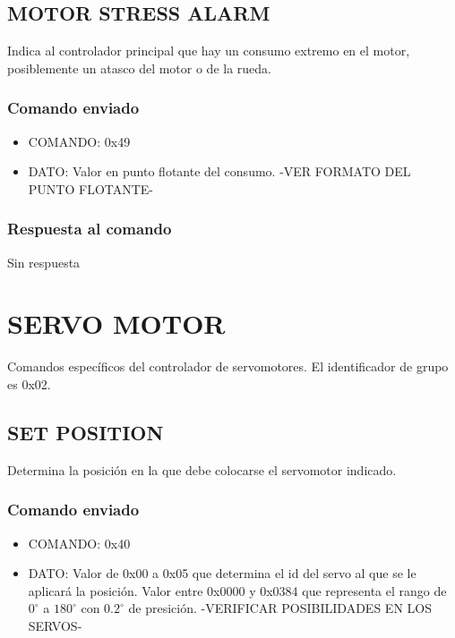 \documentclass[a4paper,10pt]{article}
\begin{document}
\subsection{MOTOR STRESS ALARM}
\label{motor_stress_alarm}

Indica al controlador principal que hay un consumo extremo en el motor, posiblemente un atasco del motor o de la rueda.

\subsubsection*{Comando enviado}

\begin{itemize}
	\item{COMANDO:} 0x49
	\item{DATO:} Valor en punto flotante del consumo. -VER FORMATO DEL PUNTO FLOTANTE-
\end{itemize}

\subsubsection*{Respuesta al comando}

Sin respuesta

\section{SERVO MOTOR}
\label{grupo_servo_motor}

Comandos espec\'ificos del controlador de servomotores.
El identificador de grupo es 0x02.

\subsection{SET POSITION}
\label{set_position}

Determina la posici\'on en la que debe colocarse el servomotor indicado.

\subsubsection*{Comando enviado}

\begin{itemize}
	\item{COMANDO:} 0x40
	\item{DATO:} Valor de 0x00 a 0x05 que determina el id del servo al que se le aplicar\'a la posici\'on.
	Valor entre 0x0000 y 0x0384 que representa el rango de $0^{\circ}$ a $180^{\circ}$ con $0.2^{\circ}$ de presici\'on. -VERIFICAR POSIBILIDADES EN LOS SERVOS-
\end{itemize}
\end{document}
